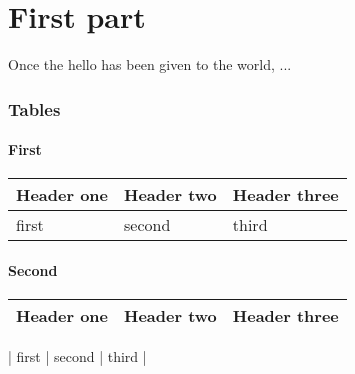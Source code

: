 \documentclass{article}
\begin{document}
\part*{First part}

Once the hello has been given to the world, ...

\section*{Tables}

\subsection*{First}


\begin{tabular}{l | l | l}
Header one  &  Header two  &  Header three
\\
\hline

first  &  second  &  third
\\

\end{tabular}

\subsection*{Second}


\begin{tabular}{l | l | l}
 Header one  &  Header two  &  Header three \\
\hline

\end{tabular}
| first | second | third |
\end{document}
